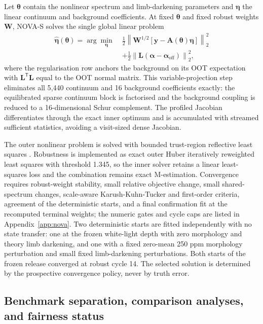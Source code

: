 Let $\bm{\theta}$ contain the nonlinear spectrum and limb-darkening
parameters and $\bm{\eta}$ the linear continuum and background coefficients.
At fixed $\bm{\theta}$ and fixed robust weights $\bm{W}$, NOVA-S solves the
single global linear problem
\begin{equation}
\begin{split}
 \widehat{\bm{\eta}}(\bm{\theta})=
 \arg\min_{\bm{\eta}}\;
 &\frac{1}{2}\left\|\bm{W}^{1/2}
 [\bm{y}-\bm{A}(\bm{\theta})\bm{\eta}]\right\|_2^2 \\
 &+\frac{1}{2}
 \left\|\bm{L}(\bm{\alpha}-\bm{\alpha}_{\mathrm{off}})\right\|_2^2 ,
\end{split}
 \label{eq:varpro}
\end{equation}
where the regularisation row anchors the background on its OOT expectation
with $\bm{L}^{\mathsf T}\bm{L}$ equal to the OOT normal matrix. This
variable-projection step \citep{GolubPereyra1973} eliminates all 5{,}440
continuum and 16 background coefficients exactly: the equilibrated sparse
continuum block is factorised and the background coupling is reduced to a
16-dimensional Schur complement. The profiled Jacobian differentiates
through the exact inner optimum and is accumulated with streamed sufficient
statistics, avoiding a visit-sized dense Jacobian.

The outer nonlinear problem is solved with bounded trust-region reflective
least squares \citep{BranchColemanLi1999}. Robustness is implemented as
exact outer Huber iteratively reweighted least squares \citep{Huber1964}
with threshold 1.345, so the inner solver retains a linear least-squares
loss and the combination remains exact M-estimation. Convergence requires
robust-weight stability, small relative objective change, small
shared-spectrum changes, scale-aware Karush-Kuhn-Tucker and first-order
criteria, agreement of the deterministic starts, and a final confirmation
fit at the recomputed terminal weights; the numeric gates and cycle caps are
listed in Appendix~\ref{app:nova}. Two deterministic starts are fitted
independently with no state transfer: one at the frozen white-light depth
with zero morphology and theory limb darkening, and one with a fixed
zero-mean 250 ppm morphology perturbation and small fixed limb-darkening
perturbations. Both starts of the frozen release converged at robust cycle
14. The selected solution is determined by the prospective convergence
policy, never by truth error.

\subsection{Benchmark separation, comparison analyses, and fairness status}

